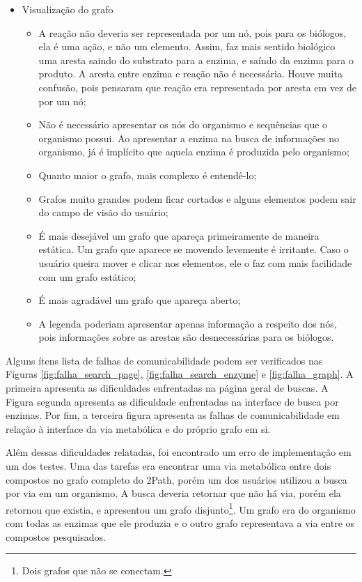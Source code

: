 \begin{itemize}
\item Visualização do grafo
  \begin{itemize}
  \item[1] A reação não deveria ser representada por um nó, pois para os biólogos, ela é uma ação, e não um elemento. Assim, faz mais sentido biológico uma aresta saindo do substrato para a enzima, e saíndo da enzima para o produto. A aresta entre enzima e reação não é necessária. Houve muita confusão, pois pensaram que reação era representada por aresta em vez de por um nó;
  \item[2] Não é necessário apresentar os nós do organismo e sequências que o organismo possui. Ao apresentar a enzima na busca de informações no organismo, já é implícito que aquela enzima é produzida pelo organismo;
  \item[3] Quanto maior o grafo, mais complexo é entendê-lo;
  \item[4] Grafos muito grandes podem ficar cortados e alguns elementos podem sair do campo de visão do usuário;
  \item[5] É mais desejável um grafo que apareça primeiramente de maneira estática. Um grafo que aparece se movendo levemente é irritante. Caso o usuário queira mover e clicar nos elementos, ele o faz com mais facilidade com um grafo estático;
  \item[6] É mais agradável um grafo que apareça aberto;
  \item[7] A legenda poderiam apresentar apenas informação a respeito dos nós, pois informações sobre as arestas são desnecessárias para os biólogos.
  \end{itemize}
\end{itemize}

\indent Alguns ítens lista de falhas de comunicabilidade podem ser verificados nas Figuras \ref{fig:falha_search_page}, \ref{fig:falha_search_enzyme} e \ref{fig:falha_graph}. A primeira apresenta as dificuldades enfrentadas na página geral de buscas. A Figura segunda apresenta as dificuldade enfrentadas na interface de busca por enzimas. Por fim, a terceira figura apresenta as falhas de comunicabilidade em relação à interface da via metabólica e do próprio grafo em si.

\indent Além dessas dificuldades relatadas, foi encontrado um erro de implementação em um dos testes. Uma das tarefas era encontrar uma via metabólica entre dois compostos no grafo completo do 2Path, porém um dos usuários utilizou a busca por via em um organismo. A busca deveria retornar que não há via, porém ela retornou que existia, e apresentou um grafo disjunto\footnote{Dois grafos que não se conectam.}. Um grafo era do organismo com todas as enzimas que ele produzia e o outro grafo representava a via entre os compostos pesquisados.


